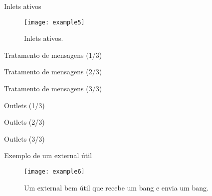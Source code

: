 \begin{frame}{Inlets ativos}
\begin{figure}[h!]
\centering
\texttt{[image: example5]}
\caption{Inlets ativos.}
\label{fig:inlet-ativo}
\end{figure}
\end{frame}


\begin{frame}[fragile]{Tratamento de mensagens (1/3)}

\end{frame}


\begin{frame}[fragile]{Tratamento de mensagens (2/3)}

\end{frame}


\begin{frame}[fragile]{Tratamento de mensagens (3/3)}

\end{frame}


\begin{frame}{Outlets (1/3)}

\end{frame}


\begin{frame}{Outlets (2/3)}

\end{frame}


\begin{frame}{Outlets (3/3)}

\end{frame}


\begin{frame}{Exemplo de um external útil}
\begin{figure}[h!]
\centering
\texttt{[image: example6]}
\caption{Um external bem útil que recebe um bang e envia um bang.}
\label{fig:outlet-bang}
\end{figure}
\end{frame}

